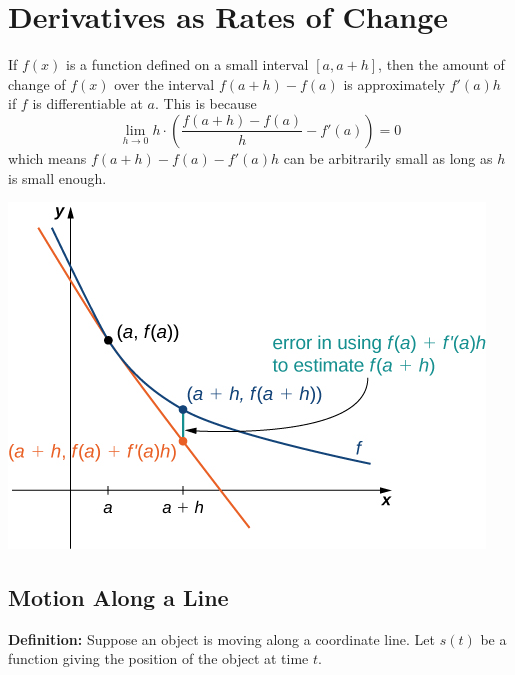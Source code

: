 
\hypertarget{derivatives-as-rates-of-change}{%
\section{Derivatives as Rates of
Change}\label{derivatives-as-rates-of-change}}

If \(f(x)\) is a function defined on a small interval \([a, a+h]\), then
the amount of change of \(f(x)\) over the interval \(f(a+h)-f(a)\) is
approximately \(f'(a)h\) if \(f\) is differentiable at \(a\). This is
because
\[\lim\limits_{h\to 0}h\cdot\left(\dfrac{f(a+h)-f(a)}{h}-f'(a)\right)=0\]
which means \(f(a+h)-f(a)-f'(a)h\) can be arbitrarily small as long as
\(h\) is small enough.

\begin{fullwidth}
  \centering
  \includegraphics{img/DerivativeRateChange.png}
\end{fullwidth}

\hypertarget{motion-along-a-line}{%
\subsection{Motion Along a Line}\label{motion-along-a-line}}

\textbf{Definition:} Suppose an object is moving along a coordinate
line. Let \(s(t)\) be a function giving the position of the object at
time \(t\).

